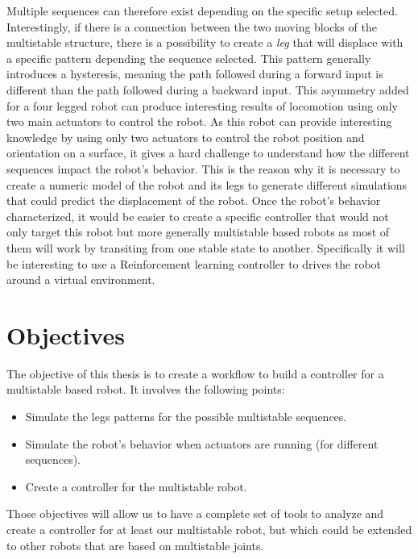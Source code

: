     Multiple sequences can therefore exist depending on the specific setup selected. Interestingly, if there is a connection between the two moving blocks of the multistable structure, there is a possibility to create a \textit{leg} that will displace with a specific pattern depending the sequence selected. This pattern generally introduces a hysteresis, meaning the path followed during a forward input is different than the path followed during a backward input. This asymmetry added for a four legged robot can produce interesting results of locomotion using only two main actuators to control the robot. As this robot can provide interesting knowledge by using only two actuators to control the robot position and orientation on a surface, it gives a hard challenge to understand how the different sequences impact the robot's behavior. This is the reason why it is necessary to create a numeric model of the robot and its legs to generate different simulations that could predict the displacement of the robot. Once the robot's behavior characterized, it would be easier to create a specific controller that would not only target this robot but more generally multistable based robots as most of them will work by transiting from one stable state to another. Specifically it will be interesting to use a Reinforcement learning controller to drives the robot around a virtual environment.
    

\section{Objectives}
    The objective of this thesis is to create a workflow to build a controller for a multistable based robot. It involves the following points:
    \begin{itemize}
        \item Simulate the legs patterns for the possible multistable sequences.
        \item Simulate the robot's behavior when actuators are running (for different sequences).
        \item Create a controller for the multistable robot.
    \end{itemize}

    Those objectives will allow us to have a complete set of tools to analyze and create a controller for at least our multistable robot, but which could be extended to other robots that are based on multistable joints.\\